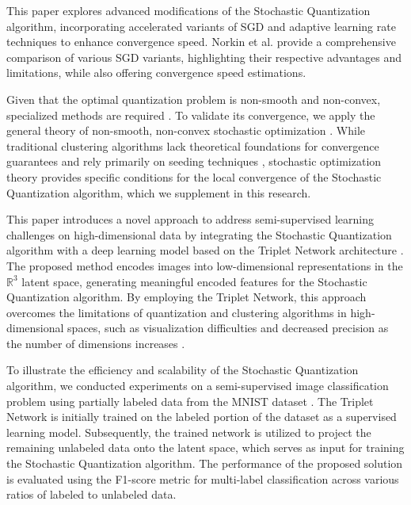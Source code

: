 This paper explores advanced modifications of the Stochastic Quantization algorithm, incorporating accelerated variants of SGD \cite{nesterov1983method,Poliak_1987,walkington_2023} and adaptive learning rate techniques \cite{kingma2017adam,tieleman2012rmsprop} to enhance convergence speed. Norkin et al. \cite{Norkin_Kozyriev_Norkin_2024} provide a comprehensive comparison of various SGD variants, highlighting their respective advantages and limitations, while also offering convergence speed estimations.

Given that the optimal quantization problem is non-smooth and non-convex, specialized methods are required \cite{Gandikota_Kane_Maity_Mazumdar_2022,Tang_2017,Zhao_Lan_Chen_Ngo_2021}. To validate its convergence, we apply the general theory of non-smooth, non-convex stochastic optimization \cite{Ermoliev_Norkin_2003,Ermolev_Norkin_1998,mikhalevich2024}. While traditional clustering algorithms lack theoretical foundations for convergence guarantees and rely primarily on seeding techniques \cite{Arthur_Vassilvitskii_2007}, stochastic optimization theory provides specific conditions for the local convergence of the Stochastic Quantization algorithm, which we supplement in this research.

This paper introduces a novel approach to address semi-supervised learning challenges on high-dimensional data by integrating the Stochastic Quantization algorithm with a deep learning model based on the Triplet Network architecture \cite{Hoffer_2015}. The proposed method encodes images into low-dimensional representations in the $\mathbb{R}^3$ latent space, generating meaningful encoded features for the Stochastic Quantization algorithm. By employing the Triplet Network, this approach overcomes the limitations of quantization and clustering algorithms in high-dimensional spaces, such as visualization difficulties and decreased precision as the number of dimensions increases \cite{Kriegel_Kröger_Zimek_2009}.

To illustrate the efficiency and scalability of the Stochastic Quantization algorithm, we conducted experiments on a semi-supervised image classification problem using partially labeled data from the MNIST dataset \cite{lecun2010mnist}. The Triplet Network is initially trained on the labeled portion of the dataset as a supervised learning model. Subsequently, the trained network is utilized to project the remaining unlabeled data onto the latent space, which serves as input for training the Stochastic Quantization algorithm. The performance of the proposed solution is evaluated using the F1-score metric \cite{Chinchor_1992} for multi-label classification across various ratios of labeled to unlabeled data.
